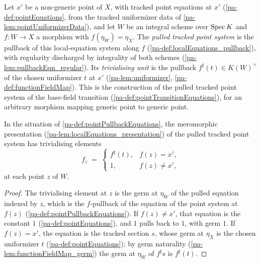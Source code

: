 \begin{definition}
  \label{pa-def:pointPullbackEquations}
  \leanok

  Let \(x'\) be a non-generic point of \(X\), with tracked point equations at \(x'\)
  (\ref{pa-def:pointEquations}, from the tracked uniformizer data of
  \ref{pa-lem:pointUniformizerData}), and let \(W\) be an integral scheme over \(\operatorname{Spec} K\)
  and \(f : W \to X\) a morphism with \(f(\eta_W) = \eta_X\). The \emph{pulled tracked
  point system} is the pullback of this local-equation system along \(f\)
  (\ref{pa-def:localEquations_pullback}), with regularity discharged by integrality of
  both schemes (\ref{pa-lem:pullbackEqn_regular}). Its \emph{trivialising unit} is the
  pullback \(f^{\sharp}(t) \in K(W)^{\times}\) of the chosen uniformizer \(t\) at
  \(x'\) (\ref{pa-lem:uniformizer}, \ref{pa-def:functionFieldMap}). This is the construction
  of the pulled tracked point system of the base-field transition
  (\ref{pa-def:pointTransitionEquations}), for an arbitrary morphism mapping generic
  point to generic point.
\end{definition}

\begin{lemma}
  \label{pa-lem:pointPullbackEquations_elem}
  \leanok

  In the situation of \ref{pa-def:pointPullbackEquations}, the meromorphic presentation
  (\ref{pa-lem:localEquations_presentation}) of the pulled tracked point system has
  trivialising elements
  \[
    f_z \;=\;
    \begin{cases}
      f^{\sharp}(t), & f(z) = x', \\
      1, & f(z) \neq x',
    \end{cases}
  \]
  at each point \(z\) of \(W\).
\end{lemma}
\begin{proof}
  \leanok
  The trivialising element at \(z\) is the germ at \(\eta_W\) of the pulled equation
  indexed by \(z\), which is the \(f\)-pullback of the equation of the point system at
  \(f(z)\) (\ref{pa-def:pointPullbackEquations}). If \(f(z) \neq x'\), that equation is
  the constant \(1\) (\ref{pa-def:pointEquations}), and \(1\) pulls back to \(1\), with
  germ \(1\). If \(f(z) = x'\), the equation is the tracked section \(s\), whose germ
  at \(\eta_X\) is the chosen uniformizer \(t\) (\ref{pa-def:pointEquations}); by germ
  naturality (\ref{pa-lem:functionFieldMap_germ}) the germ at \(\eta_W\) of
  \(f^{\sharp}s\) is \(f^{\sharp}(t)\).
\end{proof}

